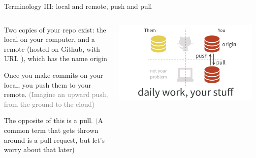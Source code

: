 \documentclass[ignorenonframetext, 10pt, aspectratio=169]{beamer}
\begin{document}
\begin{frame}{Terminology III: local and remote, push and pull}
\begin{columns}
\begin{column}{0.5\textwidth}
\begin{wideitemize}
\item Two copies of your repo exist: the \alert{local} on your computer, and a \alert{remote} (hosted on Github, with URL ), \pause which has the name \alert{origin}
\item Once you make commits on your local, you \alert{push} them to your remote. \textcolor{gray}{(Imagine an upward push, from the ground to the cloud)}
\item The opposite of this is a \alert{pull}. \textcolor{gray}(A common term that gets thrown around is a \alert{pull request}, but let's worry about that later)
\end{wideitemize}
\end{column}
\begin{column}{0.5\textwidth}
\includegraphics[width = \linewidth]{pull-push-yours.png}
\end{column}
\end{columns}
\end{frame}
\end{document}
